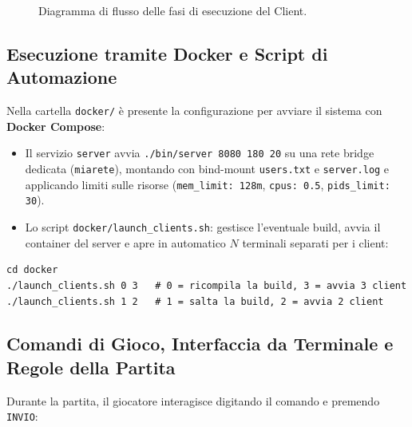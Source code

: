 \documentclass[11pt,a4paper]{article}
\begin{document}
\begin{figure}[htbp]
\caption{Diagramma di flusso delle fasi di esecuzione del Client.}
\label{fig:client-flow}
\end{figure}

\subsection{Esecuzione tramite Docker e Script di Automazione}

Nella cartella \texttt{docker/} è presente la configurazione per avviare il sistema con \textbf{Docker Compose}:
\begin{itemize}
    \item Il servizio \texttt{server} avvia \texttt{./bin/server 8080 180 20} su una rete bridge dedicata (\texttt{miarete}), montando con bind-mount \texttt{users.txt} e \texttt{server.log} e applicando limiti sulle risorse (\texttt{mem\_limit: 128m}, \texttt{cpus: 0.5}, \texttt{pids\_limit: 30}).
    \item Lo script \texttt{docker/launch\_clients.sh}: gestisce l'eventuale build, avvia il container del server e apre in automatico $N$ terminali separati per i client:
\end{itemize}

\begin{lstlisting}[style=bashstyle]
cd docker
./launch_clients.sh 0 3   # 0 = ricompila la build, 3 = avvia 3 client
./launch_clients.sh 1 2   # 1 = salta la build, 2 = avvia 2 client
\end{lstlisting}

\subsection{Comandi di Gioco, Interfaccia da Terminale e Regole della Partita}

Durante la partita, il giocatore interagisce digitando il comando e premendo \texttt{INVIO}:
\end{document}
